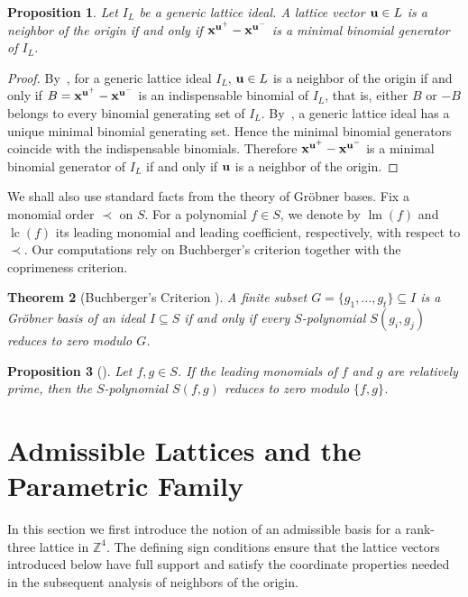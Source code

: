 \documentclass[12pt,a4paper]{amsart}
\newtheorem{theorem}{Theorem}[section]
\newtheorem{proposition}[theorem]{Proposition}
\theoremstyle{definition}
\begin{document}
\begin{proposition} \label{cor:neighbors}
Let $I_L$ be a generic lattice ideal. A lattice vector
${\bf u}\in L$ is a neighbor of the origin if and only if
$
{\bf x}^{{\bf u}^{+}}-{\bf x}^{{\bf u}^{-}}$
is a minimal binomial generator of $I_L$.
\end{proposition}

\begin{proof}
By~\cite[Theorem~2.2]{Sabzrou}, for a generic lattice ideal $I_L$,
${\bf u}\in L$ is a neighbor of the origin if and only if
$
B={\bf x}^{{\bf u}^{+}}-{\bf x}^{{\bf u}^{-}}$
is an indispensable binomial of $I_L$, that is, either $B$ or $-B$
belongs to every binomial generating set of $I_L$.
By~\cite[Remark~4.4(3)]{PS}, a generic lattice ideal has a unique
minimal binomial generating set. Hence the minimal binomial generators
coincide with the indispensable binomials. Therefore
$
{\bf x}^{{\bf u}^{+}}-{\bf x}^{{\bf u}^{-}}$ is a minimal binomial generator of $I_L$ if and only if
${\bf u}$ is a neighbor of the origin.
\end{proof}
We shall also use standard facts from the theory of Gr\"obner bases.
Fix a monomial order $\prec$ on $S$. For a polynomial $f\in S$, we
denote by $\operatorname{lm}(f)$ and $\operatorname{lc}(f)$ its
leading monomial and leading coefficient, respectively, with respect
to $\prec$. Our computations rely on Buchberger's criterion together
with the coprimeness criterion.

\begin{theorem}[Buchberger's Criterion {\cite[Chapter~2, \S6, Theorem~6]{CLO}}]
\label{thm:buchberger}
A finite subset $G=\{g_1,\ldots,g_t\}\subseteq I$
is a Gr\"obner basis of an ideal $I\subseteq S$ if and only if every
$S$-polynomial $S(g_i,g_j)$ reduces to zero modulo $G$.
\end{theorem}

\begin{proposition}[{\cite[Chapter~2, Proposition~4]{CLO}}]
\label{prop:coprime}
Let $f,g\in S$. If the leading monomials of $f$ and $g$ are relatively
prime, then the $S$-polynomial $S(f,g)$ reduces to zero modulo
$\{f,g\}$.
\end{proposition}

\section{Admissible Lattices and the Parametric Family}
\label{sec:setup}
In this section we first introduce the notion of an admissible basis
for a rank-three lattice in $\mathbb Z^4$. The defining sign
conditions ensure that the lattice vectors introduced below have full
support and satisfy the coordinate properties needed in the subsequent
analysis of neighbors of the origin.
\end{document}
